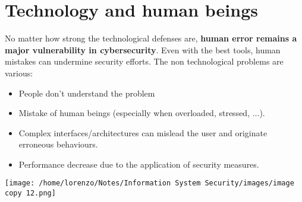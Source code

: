 \section{Technology and human beings}
\begin{minipage}{0.6\textwidth}
	\vspace{-0.5cm}
No matter how strong the technological defenses are, \textbf{human error remains a major vulnerability in cybersecurity}. Even with the best tools, human mistakes can undermine security efforts. The non technological problems are various:
\begin{itemize}
    \item People don't understand the problem
    \item Mistake of human beings (especially when overloaded, stressed, ...).
    \item Complex interfaces/architectures can mislead the user and originate erroneous behaviours. 
    \item Performance decrease due to the application of security measures.
\end{itemize}
\end{minipage} 
\hspace{0.5cm}
\begin{minipage}{0.4\textwidth}
    \centering
    \texttt{[image: /home/lorenzo/Notes/Information System Security/images/image copy 12.png]}
\end{minipage}
\\
\\
\noindent{\color{gray!50}\rule{\textwidth}{0.5pt}}













 